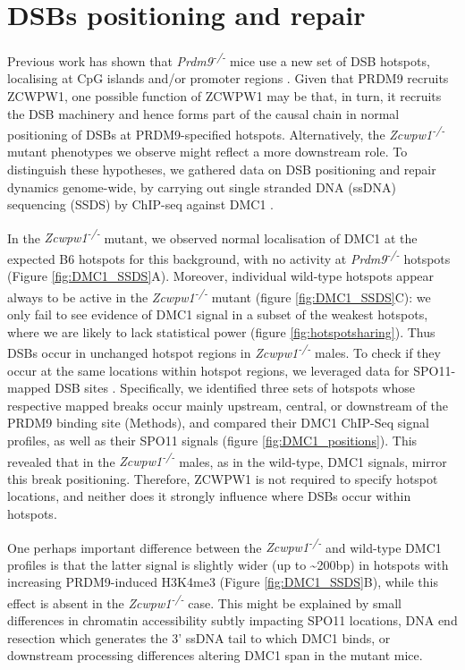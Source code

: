 \section{DSBs positioning and repair}
Previous work has shown that \textit{Prdm9\textsuperscript{-/-}} mice use a new set of DSB hotspots, localising at CpG islands and/or promoter regions \parencite{Brick2012Genetic}.
Given that PRDM9 recruits ZCWPW1, one possible function of ZCWPW1 may be that, in turn, it recruits the DSB machinery and hence forms part of the causal chain in normal positioning of DSBs at PRDM9-specified hotspots.
Alternatively, the \textit{Zcwpw1\textsuperscript{-/-}} mutant phenotypes we observe might reflect a more downstream role.
To distinguish these hypotheses, we gathered data on DSB positioning and repair dynamics genome-wide, by carrying out single stranded DNA (ssDNA) sequencing (SSDS) by ChIP-seq against DMC1 \parencite{Khil2012Sensitive}.

In the \textit{Zcwpw1\textsuperscript{-/-}} mutant, we observed normal localisation of DMC1 at the expected B6 hotspots for this background, with no activity at \textit{Prdm9\textsuperscript{-/-}} hotspots (Figure \ref{fig:DMC1_SSDS}A).
Moreover, individual wild-type hotspots appear always to be active in the \textit{Zcwpw1\textsuperscript{-/-}} mutant (figure \ref{fig:DMC1_SSDS}C): we only fail to see evidence of DMC1 signal in a subset of the weakest hotspots, where we are likely to lack statistical power (figure \ref{fig:hotspotsharing}).
Thus DSBs occur in unchanged hotspot regions in \textit{Zcwpw1\textsuperscript{-/-}} males.
To check if they occur at the same locations within hotspot regions, we leveraged data for SPO11-mapped DSB sites \parencite{Lange2016Landscape}.
Specifically, we identified three sets of hotspots whose respective mapped breaks occur mainly upstream, central, or downstream of the PRDM9 binding site (Methods), and compared their DMC1 ChIP-Seq signal profiles, as well as their SPO11 signals (figure \ref{fig:DMC1_positions}).
This revealed that in the \textit{Zcwpw1\textsuperscript{-/-}} males, as in the wild-type, DMC1 signals, mirror this break positioning.
Therefore, ZCWPW1 is not required to specify hotspot locations, and neither does it strongly influence where DSBs occur within hotspots.

One perhaps important difference between the \textit{Zcwpw1\textsuperscript{-/-}} and wild-type DMC1 profiles is that the latter signal is slightly wider (up to \textasciitilde200bp) in hotspots with increasing PRDM9-induced H3K4me3 (Figure \ref{fig:DMC1_SSDS}B), while this effect is absent in the \textit{Zcwpw1\textsuperscript{-/-}} case.
This might be explained by small differences in chromatin accessibility subtly impacting SPO11 locations, DNA end resection which generates the 3’ ssDNA tail to which DMC1 binds, or downstream processing differences altering DMC1 span in the mutant mice.


